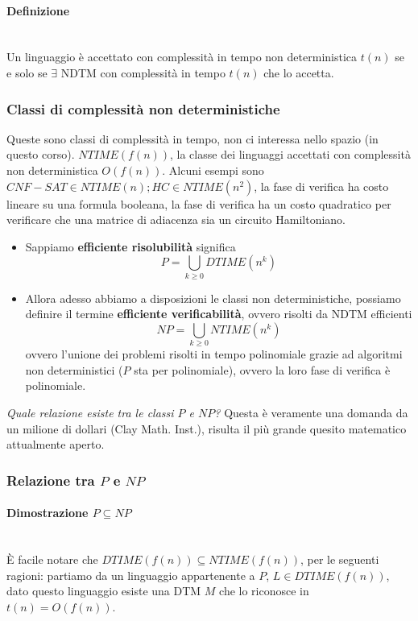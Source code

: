 \documentclass{article}
\begin{document}
\paragraph{Definizione}\mbox{}\\
Un linguaggio è accettato con complessità in tempo non deterministica $t(n)$ se e solo se
$\exists$ NDTM con complessità in tempo $t(n)$ che lo accetta.

\subsubsection{Classi di complessità non deterministiche}
Queste sono classi di complessità in tempo, non ci interessa nello spazio (in questo
corso).
$NTIME(f(n))$, la classe dei linguaggi accettati con complessità non deterministica
$O(f(n))$. Alcuni esempi sono $CNF-SAT\in NTIME(n);HC\in NTIME(n^2)$, la fase
di verifica ha costo lineare su una formula booleana, la fase di verifica ha un costo
quadratico per verificare che una matrice di adiacenza sia un circuito Hamiltoniano.

\begin{itemize}
    \item Sappiamo \textbf{efficiente risolubilità} significa
          $$P=\bigcup_{k\geq 0}DTIME(n^k)$$
    \item Allora adesso abbiamo a disposizioni le classi non deterministiche, possiamo
          definire il termine \textbf{efficiente verificabilità}, ovvero risolti da NDTM
          efficienti
          $$NP=\bigcup_{k\geq 0}NTIME(n^k)$$
          ovvero l'unione dei problemi risolti in tempo polinomiale grazie ad algoritmi non
          deterministici ($P$ sta per polinomiale), ovvero la loro fase di verifica è polinomiale.
\end{itemize}
\textit{Quale relazione esiste tra le classi $P$ e $NP$?} Questa è veramente una domanda
da un milione di dollari (Clay Math. Inst.), risulta il più grande quesito matematico
attualmente aperto.

\subsubsection{Relazione tra $P$ e $NP$}
\paragraph{Dimostrazione $P\subseteq NP$}\mbox{}\\
È facile notare che $DTIME(f(n))\subseteq NTIME(f(n))$, per le seguenti ragioni:
partiamo da un linguaggio appartenente a $P$, $L\in DTIME(f(n))$, dato questo linguaggio
esiste una DTM $M$ che lo riconosce in $t(n)=O(f(n))$.
\end{document}
